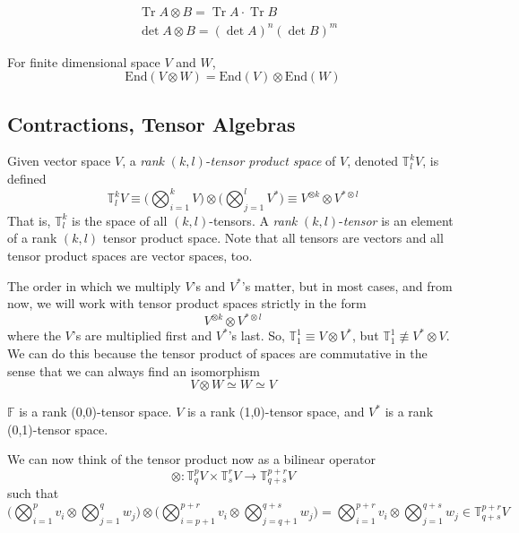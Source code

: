\documentclass{article}
\DeclareMathOperator{\Tr}{Tr}
\begin{document}
    \begin{proposition}
    \begin{align*}
        & \Tr{A \otimes B} = \Tr{A} \cdot \Tr{B} \\
        & \det{A \otimes B} = (\det{A})^n (\det{B})^m
    \end{align*}
    \end{proposition}

    \begin{proposition}
    For finite dimensional space $V$ and $W$, 
    \[\text{End}(V \otimes W) = \text{End}(V) \otimes \text{End}(W)\]
    \end{proposition}

  \subsection{Contractions, Tensor Algebras}

    \begin{definition}
    Given vector space $V$, a \textit{rank }$(k, l)$-\textit{tensor product space} of $V$, denoted $\mathbb{T}^{k}_{l} V$, is defined
    \[ \mathbb{T}^k_l V \equiv \bigg( \bigotimes_{i=1}^{k} V \bigg) \otimes \bigg( \bigotimes_{j=1}^{l} V^{*} \bigg) \equiv V^{\otimes k} \otimes V^{* \otimes l}\]
    That is, $\mathbb{T}^{k}_{l}$ is the space of all $(k, l)$-tensors. A \textit{rank }$(k, l)$-\textit{tensor} is an element of a rank $(k, l)$ tensor product space. Note that all tensors are vectors and all tensor product spaces are vector spaces, too. 

    The order in which we multiply $V$'s and $V^*$'s matter, but in most cases, and from now, we will work with tensor product spaces strictly in the form 
    \[ V^{\otimes k} \otimes V^{* \otimes l} \]
    where the $V$'s are multiplied first and $V^*$'s last. So, $\mathbb{T}^{1}_{1} \equiv V \otimes V^*$, but $\mathbb{T}^{1}_{1} \not\equiv V^* \otimes V$. We can do this because the tensor product of spaces are commutative in the sense that we can always find an isomorphism
    \[V \otimes W \simeq W \simeq V\]
    \end{definition}

    \begin{example}
    $\mathbb{F}$ is a rank (0,0)-tensor space. $V$ is a rank (1,0)-tensor space, and $V^{*}$ is a rank (0,1)-tensor space. 
    \end{example}

    We can now think of the tensor product now as a bilinear operator
    \[\otimes: \mathbb{T}^p_q V \times \mathbb{T}^r_s V \longrightarrow \mathbb{T}^{p+r}_{q+s} V\]
    such that
    \[\bigg( \bigotimes_{i=1}^p v_i \otimes \bigotimes_{j=1}^q w_j \bigg) \otimes \bigg( \bigotimes_{i = p+1}^{p+r} v_i \otimes \bigotimes_{j=q+1}^{q+s} w_j \bigg) = \bigotimes_{i=1}^{p+r} v_i \otimes \bigotimes_{j=1}^{q+s} w_j \in \mathbb{T}^{p+r}_{q+s} V\]
\end{document}
